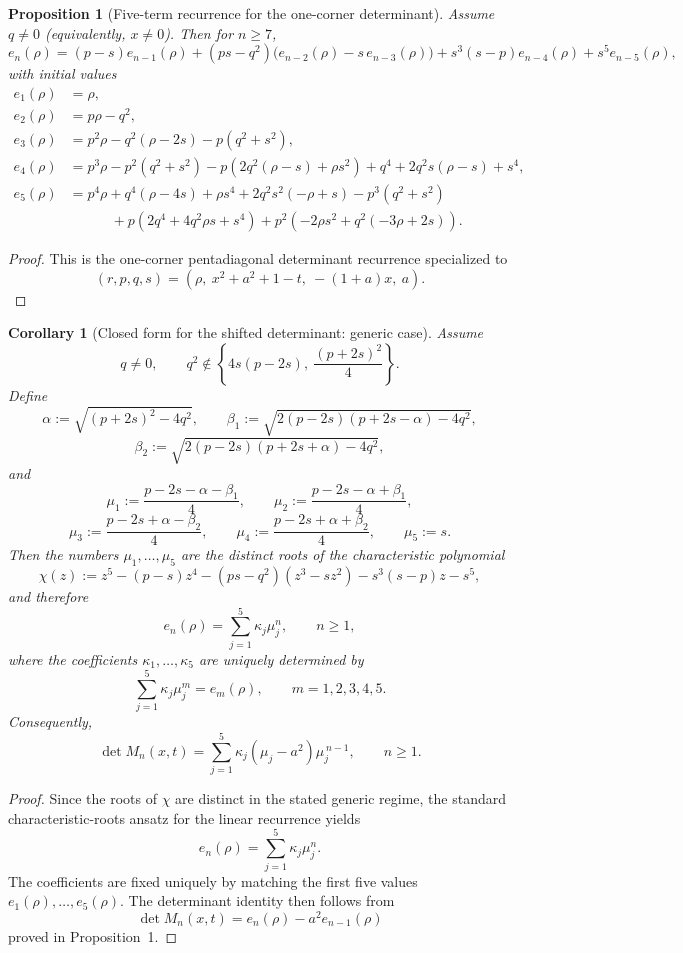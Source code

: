 \documentclass[11pt]{article}
\numberwithin{equation}{section}
\newtheorem{proposition}[theorem]{Proposition}
\newtheorem{corollary}[theorem]{Corollary}
\begin{document}
\begin{proposition}[Five-term recurrence for the one-corner determinant]
Assume $q\neq 0$ (equivalently, $x\neq 0$). Then for $n\ge 7$,
\[
e_n(\rho)
=
(p-s)e_{n-1}(\rho)
+(ps-q^2)\bigl(e_{n-2}(\rho)-s\,e_{n-3}(\rho)\bigr)
+s^3(s-p)e_{n-4}(\rho)
+s^5e_{n-5}(\rho),
\]
with initial values
\begin{align*}
e_1(\rho)&=\rho,\\
e_2(\rho)&=p\rho-q^2,\\
e_3(\rho)&=p^2\rho-q^2(\rho-2s)-p(q^2+s^2),\\
e_4(\rho)&=p^3\rho-p^2(q^2+s^2)-p\!\left(2q^2(\rho-s)+\rho s^2\right)
          +q^4+2q^2s(\rho-s)+s^4,\\
e_5(\rho)&=p^4\rho+q^4(\rho-4s)+\rho s^4+2q^2s^2(-\rho+s)-p^3(q^2+s^2)\\
&\qquad\quad
          +p\!\left(2q^4+4q^2\rho s+s^4\right)
          +p^2\!\left(-2\rho s^2+q^2(-3\rho+2s)\right).
\end{align*}
\end{proposition}

\begin{proof}
This is the one-corner pentadiagonal determinant recurrence specialized to
\[
(r,p,q,s)=(\rho,\ x^2+a^2+1-t,\ -(1+a)x,\ a).
\]
\end{proof}

\begin{corollary}[Closed form for the shifted determinant: generic case]
Assume
\[
q\neq 0,
\qquad
q^2\notin\left\{4s(p-2s),\ \frac{(p+2s)^2}{4}\right\}.
\]
Define
\[
\alpha:=\sqrt{(p+2s)^2-4q^2},
\qquad
\beta_1:=\sqrt{2(p-2s)(p+2s-\alpha)-4q^2},
\]
\[
\beta_2:=\sqrt{2(p-2s)(p+2s+\alpha)-4q^2},
\]
and
\[
\mu_1:=\frac{p-2s-\alpha-\beta_1}{4},\qquad
\mu_2:=\frac{p-2s-\alpha+\beta_1}{4},
\]
\[
\mu_3:=\frac{p-2s+\alpha-\beta_2}{4},\qquad
\mu_4:=\frac{p-2s+\alpha+\beta_2}{4},\qquad
\mu_5:=s.
\]
Then the numbers $\mu_1,\dots,\mu_5$ are the distinct roots of the characteristic
polynomial
\[
\chi(z):=
z^5-(p-s)z^4-(ps-q^2)(z^3-sz^2)-s^3(s-p)z-s^5,
\]
and therefore
\[
e_n(\rho)=\sum_{j=1}^5 \kappa_j \mu_j^n,
\qquad n\ge 1,
\]
where the coefficients $\kappa_1,\dots,\kappa_5$ are uniquely determined by
\[
\sum_{j=1}^5 \kappa_j \mu_j^m=e_m(\rho),
\qquad m=1,2,3,4,5.
\]
Consequently,
\[
\det M_n(x,t)
=
\sum_{j=1}^5 \kappa_j(\mu_j-a^2)\mu_j^{\,n-1},
\qquad n\ge 1.
\]
\end{corollary}

\begin{proof}
Since the roots of $\chi$ are distinct in the stated generic regime, the standard
characteristic-roots ansatz for the linear recurrence yields
\[
e_n(\rho)=\sum_{j=1}^5 \kappa_j\mu_j^n.
\]
The coefficients are fixed uniquely by matching the first five values
$e_1(\rho),\dots,e_5(\rho)$. The determinant identity then follows from
\[
\det M_n(x,t)=e_n(\rho)-a^2e_{n-1}(\rho)
\]
proved in Proposition~1.
\end{proof}
\end{document}
